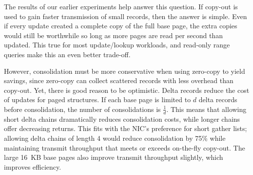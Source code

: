 


The results of our earlier experiments help answer this question.  If copy-out
is used to gain faster transmission of small records, then the answer is
simple. Even if every update created a complete copy of the full base page, the
extra copies would still be worthwhile so long as more pages are read per
second than updated. This true for most update/lookup workloads, and read-only
range queries make this an even better trade-off.

However, consolidation must be more conservative when using zero-copy to yield
savings, since zero-copy can collect scattered records with less overhead than
copy-out. Yet, there is good reason to be optimistic.  Delta records
reduce the cost of updates for paged structures. If each base page is limited
to $d$ delta records before consolidation, the number of consolidations is
$\frac{1}{d}$. This means that allowing short delta chains dramatically reduces
consolidation costs, while longer chains offer decreasing returns. This fits with
the NIC's preference for short gather lists; allowing delta chains of length 4
would reduce consolidation by 75\% while maintaining transmit throughput that
meets or exceeds on-the-fly copy-out.  The large 16~KB base pages also
improve transmit throughput slightly, which improves efficiency.


